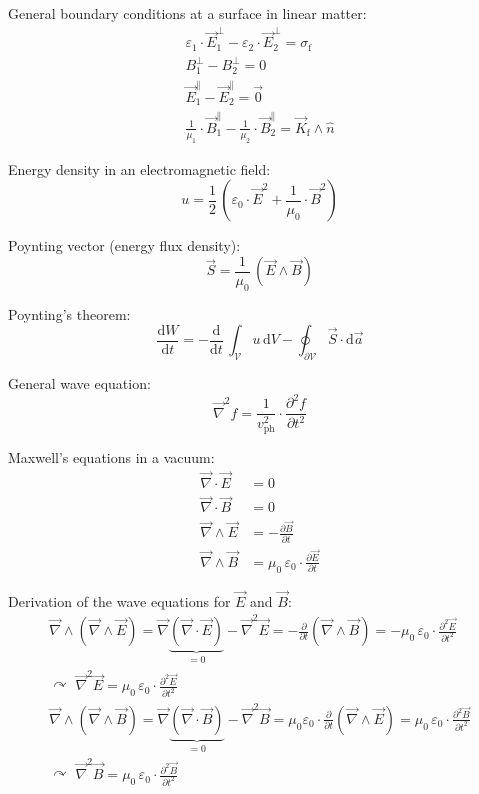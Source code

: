\documentclass[fontsize=11pt,a4paper]{scrartcl}
\begin{document}
General boundary conditions at a surface in linear matter:
\begin{gather*}
	\varepsilon_1\cdot\vec E_1^\perp-\varepsilon_2\cdot\vec E_2^\perp=\sigma_\mathrm{f}\\
	B_1^\perp-B_2^\perp=0\\
	\vec E_1^\parallel-\vec E_2^\parallel=\vec 0\\
	\frac{1}{\mu_1}\cdot\vec B_1^\parallel-\frac{1}{\mu_2}\cdot\vec B_2^\parallel=\vec K_\mathrm{f}\wedge\hat n
\end{gather*}

Energy density in an electromagnetic field:
\[
	u=\frac{1}{2}\,\left(\varepsilon_0\cdot\vec E^2+\frac{1}{\mu_0}\cdot\vec B^2\right)
\]

Poynting vector (energy flux density):
\[
	\vec S=\frac{1}{\mu_0}\,(\vec E\wedge\vec B)
\]

Poynting's theorem:
\[
	\frac{\mathrm{d}W}{\mathrm{d}t}=-\frac{\mathrm{d}}{\mathrm{d}t}\,\int_\mathcal{V}u\,\mathrm{d}V-\oint_{\partial\mathcal{V}}\vec S\cdot\mathrm{d}\vec a
\]

General wave equation:
\[
	\vec\nabla^2 f=\frac{1}{v_\mathrm{ph}^2}\cdot\frac{\partial^2 f}{\partial t^2}
\]

Maxwell's equations in a vacuum:
\begin{align*}
	\vec\nabla\cdot\vec E&=0\\
	\vec\nabla\cdot\vec B&=0\\
	\vec\nabla\wedge\vec E&=-\frac{\partial\vec B}{\partial t}\\
	\vec\nabla\wedge\vec B&=\mu_0\,\varepsilon_0\cdot\frac{\partial\vec E}{\partial t}
\end{align*}

Derivation of the wave equations for $\vec E$ and $\vec B$:
\begin{gather*}
	\vec\nabla\wedge(\vec\nabla\wedge\vec E)=
		\vec\nabla\underbrace{(\vec\nabla\cdot\vec E)}_{=0}-\vec\nabla^2\vec E=-\frac{\partial}{\partial t}(\vec\nabla\wedge\vec B)=-\mu_0\,\varepsilon_0\cdot
		\frac{\partial^2\vec E}{\partial t^2}\\
	\curvearrowright\,\,\vec\nabla^2\vec E=\mu_0\,\varepsilon_0\cdot\frac{\partial^2\vec E}{\partial t^2}\\
	\vec\nabla\wedge(\vec\nabla\wedge\vec B)=
		\vec\nabla\underbrace{(\vec\nabla\cdot\vec B)}_{=0}-\vec\nabla^2\vec B=\mu_0\varepsilon_0\cdot\frac{\partial}{\partial t}(\vec\nabla\wedge\vec E)
		=\mu_0\,\varepsilon_0\cdot\frac{\partial^2\vec B}{\partial t^2}\\
	\curvearrowright\,\,\vec\nabla^2\vec B=\mu_0\,\varepsilon_0\cdot\frac{\partial^2\vec B}{\partial t^2}
\end{gather*}
\end{document}
